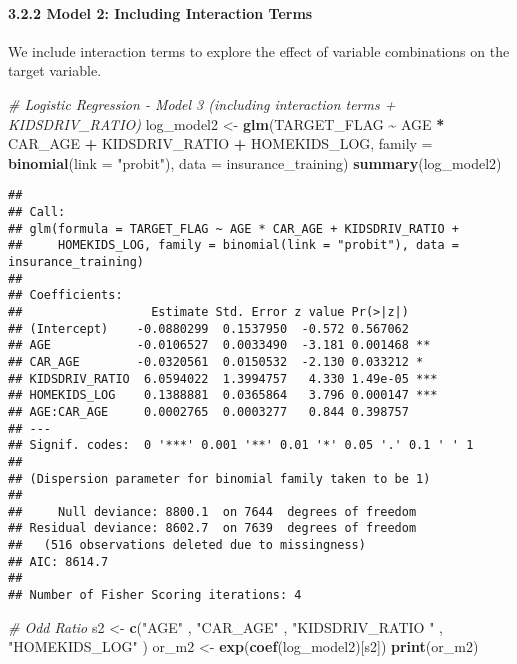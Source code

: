 \documentclass[
]{article}
\newenvironment{Shaded}{\begin{snugshade}}{\end{snugshade}}
\newcommand{\AttributeTok}[1]{\textcolor[rgb]{0.13,0.29,0.53}{#1}}
\newcommand{\CommentTok}[1]{\textcolor[rgb]{0.56,0.35,0.01}{\textit{#1}}}
\newcommand{\FunctionTok}[1]{\textcolor[rgb]{0.13,0.29,0.53}{\textbf{#1}}}
\newcommand{\NormalTok}[1]{#1}
\newcommand{\OtherTok}[1]{\textcolor[rgb]{0.56,0.35,0.01}{#1}}
\newcommand{\SpecialCharTok}[1]{\textcolor[rgb]{0.81,0.36,0.00}{\textbf{#1}}}
\newcommand{\StringTok}[1]{\textcolor[rgb]{0.31,0.60,0.02}{#1}}
\begin{document}
\paragraph{3.2.2 Model 2: Including Interaction
Terms}\label{model-2-including-interaction-terms}

We include interaction terms to explore the effect of variable
combinations on the target variable.

\begin{Shaded}
\begin{Highlighting}[]
\CommentTok{\# Logistic Regression {-} Model 3 (including interaction terms + KIDSDRIV\_RATIO)}
\NormalTok{log\_model2 }\OtherTok{\textless{}{-}} \FunctionTok{glm}\NormalTok{(TARGET\_FLAG }\SpecialCharTok{\textasciitilde{}}\NormalTok{ AGE }\SpecialCharTok{*}\NormalTok{ CAR\_AGE }\SpecialCharTok{+}\NormalTok{ KIDSDRIV\_RATIO }\SpecialCharTok{+}\NormalTok{ HOMEKIDS\_LOG, }
                  \AttributeTok{family =} \FunctionTok{binomial}\NormalTok{(}\AttributeTok{link =} \StringTok{"probit"}\NormalTok{), }\AttributeTok{data =}\NormalTok{ insurance\_training)}
\FunctionTok{summary}\NormalTok{(log\_model2)}
\end{Highlighting}
\end{Shaded}

\begin{verbatim}
## 
## Call:
## glm(formula = TARGET_FLAG ~ AGE * CAR_AGE + KIDSDRIV_RATIO + 
##     HOMEKIDS_LOG, family = binomial(link = "probit"), data = insurance_training)
## 
## Coefficients:
##                  Estimate Std. Error z value Pr(>|z|)    
## (Intercept)    -0.0880299  0.1537950  -0.572 0.567062    
## AGE            -0.0106527  0.0033490  -3.181 0.001468 ** 
## CAR_AGE        -0.0320561  0.0150532  -2.130 0.033212 *  
## KIDSDRIV_RATIO  6.0594022  1.3994757   4.330 1.49e-05 ***
## HOMEKIDS_LOG    0.1388881  0.0365864   3.796 0.000147 ***
## AGE:CAR_AGE     0.0002765  0.0003277   0.844 0.398757    
## ---
## Signif. codes:  0 '***' 0.001 '**' 0.01 '*' 0.05 '.' 0.1 ' ' 1
## 
## (Dispersion parameter for binomial family taken to be 1)
## 
##     Null deviance: 8800.1  on 7644  degrees of freedom
## Residual deviance: 8602.7  on 7639  degrees of freedom
##   (516 observations deleted due to missingness)
## AIC: 8614.7
## 
## Number of Fisher Scoring iterations: 4
\end{verbatim}

\begin{Shaded}
\begin{Highlighting}[]
\CommentTok{\# Odd Ratio }
\NormalTok{s2 }\OtherTok{\textless{}{-}} \FunctionTok{c}\NormalTok{(}\StringTok{"AGE"}\NormalTok{  , }\StringTok{"CAR\_AGE"}\NormalTok{ , }\StringTok{"KIDSDRIV\_RATIO "}\NormalTok{ , }\StringTok{"HOMEKIDS\_LOG"}\NormalTok{ )}
\NormalTok{or\_m2 }\OtherTok{\textless{}{-}} \FunctionTok{exp}\NormalTok{(}\FunctionTok{coef}\NormalTok{(log\_model2)[s2])}
\FunctionTok{print}\NormalTok{(or\_m2)}
\end{Highlighting}
\end{Shaded}
\end{document}
